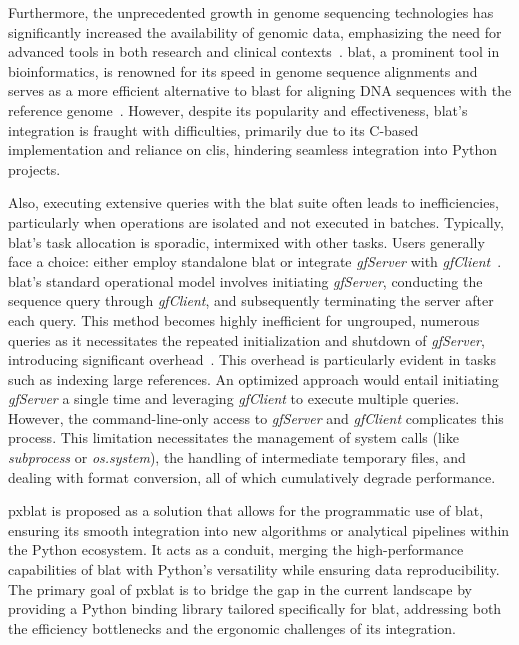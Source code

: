 \documentclass[10pt,letterpaper]{article}
\begin{document}
Furthermore, the unprecedented growth in genome sequencing technologies has significantly increased the availability of genomic data, emphasizing the need for advanced tools in both research and clinical contexts~\cite{mardis2008next,marx2023method}.
\gls{blat}, a prominent tool in bioinformatics, is renowned for its speed in genome sequence alignments and serves as a more efficient alternative to \gls{blast} for aligning DNA sequences with the reference genome~\cite{kent2002blat}.
However, despite its popularity and effectiveness, \gls{blat}'s integration is fraught with difficulties, primarily due to its C-based implementation and reliance on \glspl{cli}, hindering seamless integration into Python projects.

Also, executing extensive queries with the \gls{blat} suite often leads to inefficiencies, particularly when operations are isolated and not executed in batches.
Typically, \gls{blat}'s task allocation is sporadic, intermixed with other tasks.
Users generally face a choice: either employ standalone \gls{blat} or integrate \emph{gfServer} with \emph{gfClient}~\cite{altschul1990basic}.
\gls{blat}'s standard operational model involves initiating \emph{gfServer}, conducting the sequence query through \emph{gfClient}, and subsequently terminating the server after each query.
This method becomes highly inefficient for ungrouped, numerous queries as it necessitates the repeated initialization and shutdown of \emph{gfServer}, introducing significant overhead~\cite{kent2002blat}.
This overhead is particularly evident in tasks such as indexing large references.
An optimized approach would entail initiating \emph{gfServer} a single time and leveraging \emph{gfClient} to execute multiple queries.
However, the command-line-only access to \emph{gfServer} and \emph{gfClient} complicates this process.
This limitation necessitates the management of system calls (like \emph{subprocess} or \emph{os.system}), the handling of intermediate temporary files, and dealing with format conversion, all of which cumulatively degrade performance.

\gls{pxblat} is proposed as a solution that allows for the programmatic use of \gls{blat}, ensuring its smooth integration into new algorithms or analytical pipelines within the Python ecosystem.
It acts as a conduit, merging the high-performance capabilities of \gls{blat} with Python's versatility while ensuring data reproducibility.
The primary goal of \gls{pxblat} is to bridge the gap in the current landscape by providing a Python binding library tailored specifically for \gls{blat}, addressing both the efficiency bottlenecks and the ergonomic challenges of its integration.
\end{document}

